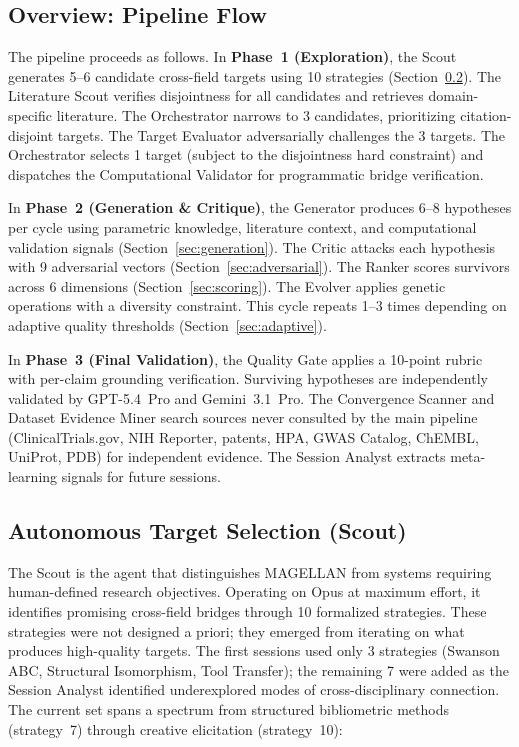 \subsection{Overview: Pipeline Flow}
\label{sec:pipeline-overview}

The pipeline proceeds as follows. In \textbf{Phase~1 (Exploration)}, the Scout generates 5--6 candidate cross-field targets using 10 strategies (Section~\ref{sec:scout}). The Literature Scout verifies disjointness for all candidates and retrieves domain-specific literature. The Orchestrator narrows to 3 candidates, prioritizing citation-disjoint targets. The Target Evaluator adversarially challenges the 3 targets. The Orchestrator selects 1 target (subject to the disjointness hard constraint) and dispatches the Computational Validator for programmatic bridge verification.

In \textbf{Phase~2 (Generation \& Critique)}, the Generator produces 6--8 hypotheses per cycle using parametric knowledge, literature context, and computational validation signals (Section~\ref{sec:generation}). The Critic attacks each hypothesis with 9 adversarial vectors (Section~\ref{sec:adversarial}). The Ranker scores survivors across 6 dimensions (Section~\ref{sec:scoring}). The Evolver applies genetic operations with a diversity constraint. This cycle repeats 1--3 times depending on adaptive quality thresholds (Section~\ref{sec:adaptive}).

In \textbf{Phase~3 (Final Validation)}, the Quality Gate applies a 10-point rubric with per-claim grounding verification. Surviving hypotheses are independently validated by GPT-5.4~Pro and Gemini~3.1~Pro. The Convergence Scanner and Dataset Evidence Miner search sources never consulted by the main pipeline (ClinicalTrials.gov, NIH Reporter, patents, HPA, GWAS Catalog, ChEMBL, UniProt, PDB) for independent evidence. The Session Analyst extracts meta-learning signals for future sessions.

\subsection{Autonomous Target Selection (Scout)}
\label{sec:scout}

The Scout is the agent that distinguishes MAGELLAN from systems requiring human-defined research objectives. Operating on Opus at maximum effort, it identifies promising cross-field bridges through 10 formalized strategies. These strategies were not designed a priori; they emerged from iterating on what produces high-quality targets. The first sessions used only 3 strategies (Swanson ABC, Structural Isomorphism, Tool Transfer); the remaining 7 were added as the Session Analyst identified underexplored modes of cross-disciplinary connection. The current set spans a spectrum from structured bibliometric methods (strategy~7) through creative elicitation (strategy~10):

